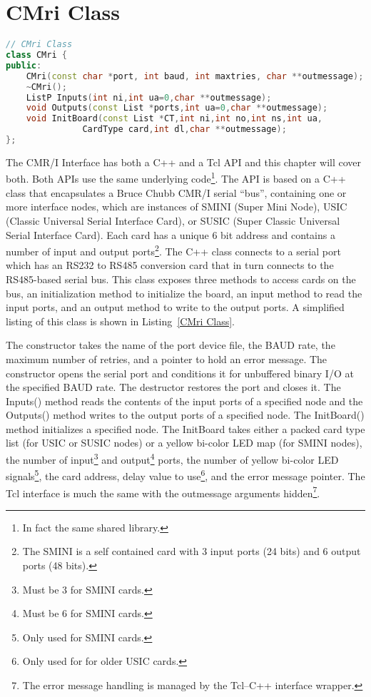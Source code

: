 \section{CMri Class}
\begin{lstlisting}[caption={CMri Class},
		   language=C++,label=lst:CMRI:CMriClass]
// CMri Class
class CMri {
public:
	CMri(const char *port, int baud, int maxtries, char **outmessage);
	~CMri();
	ListP Inputs(int ni,int ua=0,char **outmessage);
	void Outputs(const List *ports,int ua=0,char **outmessage);
	void InitBoard(const List *CT,int ni,int no,int ns,int ua,
		       CardType card,int dl,char **outmessage);
};
\end{lstlisting}
The CMR/I Interface\cite{cxxinternals} has both a C++ and a Tcl API and
this chapter will cover both. Both APIs use the same underlying 
code\footnote{In fact the same shared library.}. The API is based on a
C++ class that encapsulates a Bruce Chubb
CMR/I\cite{Chubb89,ChubbBAS04} serial ``bus'', containing one or more
interface nodes, which are instances of SMINI (Super Mini
Node), USIC (Classic Universal Serial Interface
Card), or SUSIC (Super Classic Universal
Serial Interface Card). Each card has a unique 6 bit address and
contains a number of input and output ports\footnote{The SMINI is a
self contained card with 3 input ports (24 bits) and 6 output ports (48
bits).}. The C++ class connects to a serial port which has an RS232 to
RS485 conversion card that in turn connects to the RS485-based serial
bus. This class exposes three methods to access cards on the bus, an
initialization method to initialize the board, an input method to read
the input ports, and an output method to write to the output ports. A
simplified listing of this class is shown in
Listing~\ref{CMri Class}. 

The constructor takes the name of the port device file, the BAUD rate,
the maximum number of retries, and a pointer to hold an error message.
The constructor opens the serial port and conditions it for unbuffered
binary I/O at the specified BAUD rate. The destructor restores the port
and closes it. The Inputs() method reads the contents of the input
ports of a specified node and the Outputs() method writes to the output
ports of a specified node. The InitBoard() method initializes a
specified node. The InitBoard takes either a packed card type list (for
USIC or SUSIC nodes) or a yellow bi-color LED map (for SMINI nodes),
the number of input\footnote{Must be 3 for SMINI cards.} and
output\footnote{Must be 6 for SMINI cards.} ports, the number of yellow
bi-color LED signals\footnote{Only used for SMINI cards.}, the card
address, delay value to use\footnote{Only used for for older USIC
cards.}, and the error message pointer.  The Tcl interface is much the
same with the outmessage arguments hidden\footnote{The error message
handling is managed by the Tcl--C++ interface wrapper.}.


